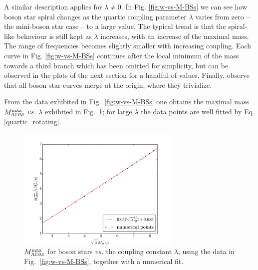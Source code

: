 A similar description applies for $\lambda\neq 0$. In Fig. \ref{fig:w-vs-M-BSs} we can see how boson star spiral changes as the quartic coupling parameter $\lambda$ varies from zero -- the mini-boson star case -- to a large value. The typical trend is that the spiral-like behaviour is still kept as $\lambda$ increases, with an increase of the maximal mass. The range of frequencies becomes slightly smaller with increasing coupling. Each curve in Fig. \ref{fig:w-vs-M-BSs} continues after the local minimum of the mass towards a third branch which has been omitted for simplicity, but can be observed in the plots of the next section for a handful of values. Finally, observe that all boson star curves merge at the origin, where they trivialize. 

From the data exhibited in Fig.~\ref{fig:w-vs-M-BSs} one obtains the maximal mass $M_{\rm ADM}^{\rm max}$ $vs.$ $\lambda$ exhibited in Fig.~\ref{max_mass_0}; for large $\lambda$ the data points are well fitted by Eq. \eqref{quartic_rotating}.
%
\begin{figure}[h!]
  \begin{center}
    \includegraphics[width=0.7\textwidth]{papers/selfInteractions/max-mass.png}
  \end{center}
  \caption{$M_{\rm ADM}^{\rm max}$ for boson stars $vs.$ the coupling constant $\lambda$, using the data in Fig.~\ref{fig:w-vs-M-BSs}, together with a numerical fit.}
  \label{max_mass_0}
\end{figure}
%






